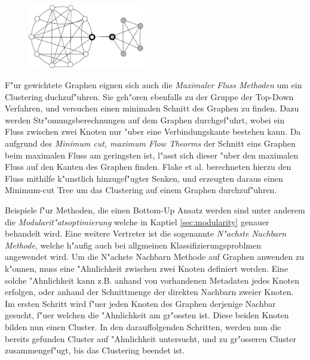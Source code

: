 \documentclass[journal]{vgtc}
\begin{document}
    \begin{figure}[h]
    \centering
    \includegraphics[width=2in]{images/random_walk}
    \caption{\label{fig:random_walk} \cite{Schaeffer}}
    \end{figure}
    
  F"ur gewichtete Graphen eignen sich auch die \emph{Maximaler Fluss Methoden} um ein Clustering duchzuf"uhren. Sie
  geh"oren ebenfalls zu der Gruppe der Top-Down Verfahren, und versuchen einen minimalen Schnitt \cite{Schaeffer} des Graphen zu finden. 
  Dazu werden Str"omungsberechnungen auf dem Graphen durchgef"uhrt, wobei ein Fluss zwischen zwei Knoten nur "uber eine Verbindungskante bestehen kann.
  Da aufgrund des \emph{Minimum cut, maximum Flow Theorms} der Schnitt eins Graphen beim maximalen Fluss am geringsten ist, l"asst sich dieser "uber
  den maximalen Fluss auf den Kanten des Graphen finden. Flake et al.\cite{flake} berechneten hierzu den Fluss mithilfe k"unstlich hinzugef"ugter
  Senken, und erzeugten daraus einen Minimum-cut Tree\cite{minimum_cut_tree} um das Clustering auf einem Graphen durchzuf"uhren.
  
  Beispiele f"ur Methoden, die einen Bottom-Up Ansatz werden sind unter anderem die \emph{Modularit"atsoptimierung} welche
  in Kaptiel \ref{sec:modularity} genauer behandelt wird. Eine weitere Vertreter ist die sogenannte \emph{N"achste Nachbarn Methode}\cite{Schaeffer}, welche
  h"aufig auch bei allgmeinen Klassifizierungsproblmen angewendet wird. Um die N"achste Nachbarn Methode auf Graphen anwenden
  zu k"onnen, muss eine "Ahnlichkeit zwischen zwei Knoten definiert werden. Eine solche "Ahnlichkeit
  kann z.B. anhand von vorhandenen Metadaten jedes Knoten erfolgen, oder anhand der Schnittmenge der direkten Nachbarn zweier
  Knoten. Im ersten Schritt wird f"uer jeden Knoten des Graphen derjenige Nachbar gesucht, f"uer welchen die "Ahnlichkeit am gr"ossten ist.
  Diese beiden Knoten bilden nun einen Cluster. In den darauffolgenden Schritten, werden nun die bereits gefunden Cluster auf "Ahnlichkeit
  untersucht, und zu gr"osseren Cluster zusammengef"ugt, bis das Clustering beendet ist.
  
  
\end{document}
